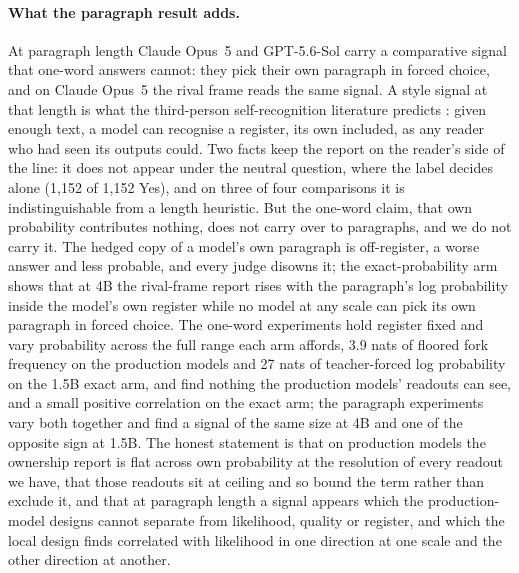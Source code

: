 \documentclass[twocolumn,10pt]{article}
\newcommand{\opus}{Claude Opus~5}
\newcommand{\gpt}{GPT-5.6-Sol}
\begin{document}
\paragraph{What the paragraph result adds.} At paragraph length \opus{} and \gpt{} carry a comparative signal that one-word answers cannot: they pick their own paragraph in forced choice, and on \opus{} the rival frame reads the same signal. A style signal at that length is what the third-person self-recognition literature predicts \citep{panickssery2024llm,wang2026prefill}: given enough text, a model can recognise a register, its own included, as any reader who had seen its outputs could. Two facts keep the report on the reader's side of the line: it does not appear under the neutral question, where the label decides alone (1,152 of 1,152 Yes), and on three of four comparisons it is indistinguishable from a length heuristic. But the one-word claim, that own probability contributes nothing, does not carry over to paragraphs, and we do not carry it. The hedged copy of a model's own paragraph is off-register, a worse answer and less probable, and every judge disowns it; the exact-probability arm shows that at 4B the rival-frame report rises with the paragraph's log probability inside the model's own register while no model at any scale can pick its own paragraph in forced choice. The one-word experiments hold register fixed and vary probability across the full range each arm affords, 3.9 nats of floored fork frequency on the production models and 27 nats of teacher-forced log probability on the 1.5B exact arm, and find nothing the production models' readouts can see, and a small positive correlation on the exact arm; the paragraph experiments vary both together and find a signal of the same size at 4B and one of the opposite sign at 1.5B. The honest statement is that on production models the ownership report is flat across own probability at the resolution of every readout we have, that those readouts sit at ceiling and so bound the term rather than exclude it, and that at paragraph length a signal appears which the production-model designs cannot separate from likelihood, quality or register, and which the local design finds correlated with likelihood in one direction at one scale and the other direction at another.
\end{document}
